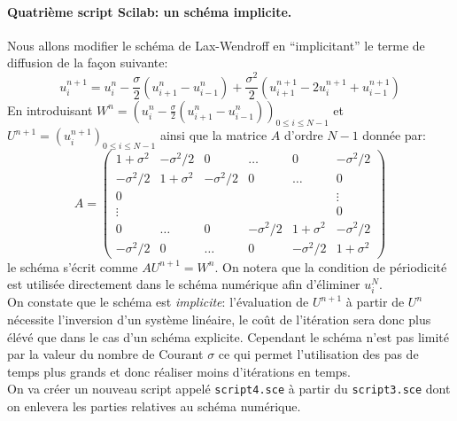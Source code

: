 \documentclass[12pt,a4paper]{article}
\begin{document}
\paragraph{Quatri\`eme script Scilab: un sch\'ema implicite.} Nous allons modifier le sch\'ema de Lax-Wendroff en ``implicitant'' le terme de diffusion de la fa\c{c}on suivante:
$$
u_i^{n+1}=u_i^n-\frac{\sigma}{2}(u_{i+1}^n-u_{i-1}^n)+\frac{\sigma^2}{2}(u_{i+1}^{n+1}-2u_i^{n+1}+u_{i-1}^{n+1})
$$ 
En introduisant $W^n =
(u_i^n-\frac{\sigma}{2}(u_{i+1}^n-u_{i-1}^n))_{0\le i\le N-1}$ et
$U^{n+1}=(u_i^{n+1})_{0\le i\le N-1}$ ainsi que la matrice $A$ d'ordre
$N-1$ donn\'ee par:
$$
A = \left(\begin{array}{cccccc}
1+\sigma^2  & -\sigma^2/2 & 0           & \hdots & 0      & -\sigma^2/2 \\
-\sigma^2/2 & 1+\sigma^2  & -\sigma^2/2 & 0      & \hdots & 0 \\
0           &             &             &        &        & \vdots \\
\vdots      &             &             &        &        & 0 \\
0       & \hdots & 0 &-\sigma^2/2 & 1+\sigma^2 &-\sigma^2/2\\
-\sigma^2/2 & 0 & \hdots & 0 & -\sigma^2/2 & 1+\sigma^2
\end{array}\right)
$$ 
le sch\'ema s'\'ecrit comme $AU^{n+1}=W^n$. On notera que la
condition de p\'eriodicit\'e est utilis\'ee directement dans le sch\'ema num\'erique afin d'\'eliminer $u_i^N$. \\ 
\noindent On constate que le sch\'ema est {\it implicite}: l'\'evaluation de $U^{n+1}$ \`a partir
de $U^n$ n\'ecessite l'inversion d'un syst\`eme lin\'eaire, le co\^ut
de l'it\'eration sera donc plus \'el\'ev\'e que dans le cas d'un
sch\'ema explicite. Cependant le sch\'ema n'est pas limit\'e par la
valeur du nombre de Courant $\sigma$ ce qui permet l'utilisation des
pas de temps plus grands et donc r\'ealiser moins d'it\'erations en
temps.\\

\noindent On va cr\'eer un nouveau script appel\'e \texttt{script4.sce} \`a
partir du \texttt{script3.sce} dont on enlevera les parties relatives
au sch\'ema num\'erique.
\end{document}
